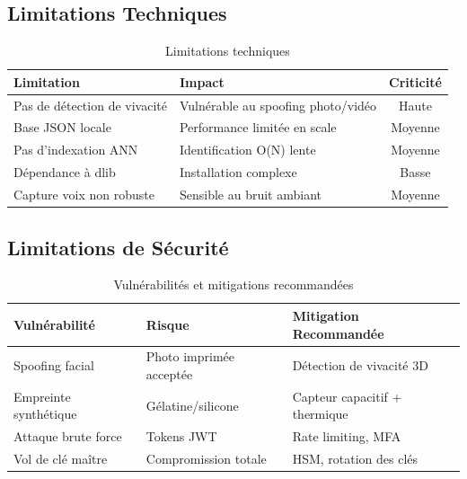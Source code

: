 \documentclass[12pt,a4paper]{report}
\begin{document}
\subsection{Limitations Techniques}

\begin{table}[H]
    \centering
    \caption{Limitations techniques}
    \label{tab:limitations}
    \begin{tabular}{|p{4cm}|p{5cm}|c|}
        \hline
        \textbf{Limitation} & \textbf{Impact} & \textbf{Criticité} \\
        \hline
        Pas de détection de vivacité & Vulnérable au spoofing photo/vidéo & \textcolor{bioid-red}{Haute} \\
        \hline
        Base JSON locale & Performance limitée en scale & \textcolor{bioid-orange}{Moyenne} \\
        \hline
        Pas d'indexation ANN & Identification O(N) lente & \textcolor{bioid-orange}{Moyenne} \\
        \hline
        Dépendance à dlib & Installation complexe & \textcolor{bioid-green}{Basse} \\
        \hline
        Capture voix non robuste & Sensible au bruit ambiant & \textcolor{bioid-orange}{Moyenne} \\
        \hline
    \end{tabular}
\end{table}

\subsection{Limitations de Sécurité}

\begin{table}[H]
    \centering
    \caption{Vulnérabilités et mitigations recommandées}
    \label{tab:vulnerabilities}
    \begin{tabular}{|l|l|p{4cm}|}
        \hline
        \textbf{Vulnérabilité} & \textbf{Risque} & \textbf{Mitigation Recommandée} \\
        \hline
        Spoofing facial & Photo imprimée acceptée & Détection de vivacité 3D \\
        \hline
        Empreinte synthétique & Gélatine/silicone & Capteur capacitif + thermique \\
        \hline
        Attaque brute force & Tokens JWT & Rate limiting, MFA \\
        \hline
        Vol de clé maître & Compromission totale & HSM, rotation des clés \\
        \hline
    \end{tabular}
\end{table}
\end{document}
